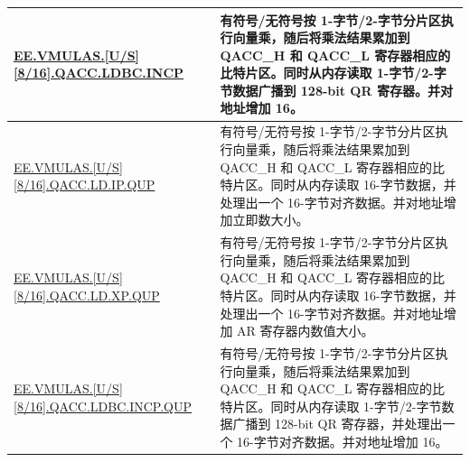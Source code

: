 \begin{longtable}[c]{|l|m{9cm}|}
    \\\hline
    \hyperref[instruction:EEVMULASU8QACCLDBCINCP]{EE.VMULAS.[U/S][8/16].QACC.LDBC.INCP} & 有符号/无符号按 1-字节/2-字节分片区执行向量乘，随后将乘法结果累加到 QACC\_H 和 QACC\_L 寄存器相应的比特片区。同时从内存读取 1-字节/2-字节数据广播到 128-bit QR 寄存器。并对地址增加 16。
    \\\hline
    \hyperref[instruction:EEVMULASU8QACCLDIPQUP]{EE.VMULAS.[U/S][8/16].QACC.LD.IP.QUP} & 有符号/无符号按 1-字节/2-字节分片区执行向量乘，随后将乘法结果累加到 QACC\_H 和 QACC\_L 寄存器相应的比特片区。同时从内存读取 16-字节数据，并处理出一个 16-字节对齐数据。并对地址增加立即数大小。
    \\\hline
    \hyperref[instruction:EEVMULASU8QACCLDXPQUP]{EE.VMULAS.[U/S][8/16].QACC.LD.XP.QUP} & 有符号/无符号按 1-字节/2-字节分片区执行向量乘，随后将乘法结果累加到 QACC\_H 和 QACC\_L 寄存器相应的比特片区。同时从内存读取 16-字节数据，并处理出一个 16-字节对齐数据。并对地址增加 AR 寄存器内数值大小。
    \\\hline
    \hyperref[instruction:EEVMULASU8QACCLDBCINCPQUP]{EE.VMULAS.[U/S][8/16].QACC.LDBC.INCP.QUP} & 有符号/无符号按 1-字节/2-字节分片区执行向量乘，随后将乘法结果累加到 QACC\_H 和 QACC\_L 寄存器相应的比特片区。同时从内存读取 1-字节/2-字节数据广播到 128-bit QR 寄存器，并处理出一个 16-字节对齐数据。并对地址增加 16。
    \\\hline
\end{longtable}
